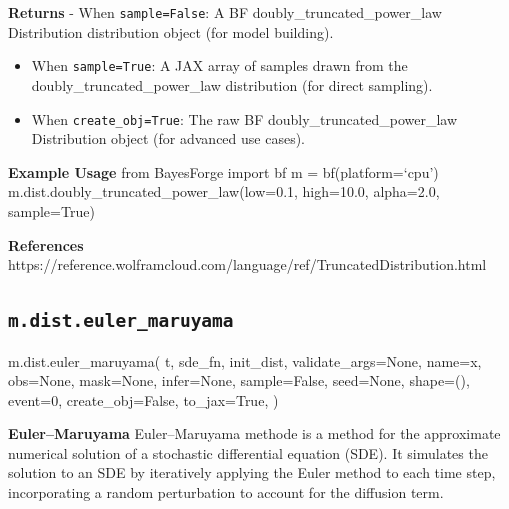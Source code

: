 \documentclass[
  letterpaper,
  DIV=11,
  numbers=noendperiod]{scrartcl}
\newenvironment{Shaded}{\begin{snugshade}}{\end{snugshade}}
\newcommand{\DecValTok}[1]{\textcolor[rgb]{0.68,0.00,0.00}{#1}}
\newcommand{\NormalTok}[1]{\textcolor[rgb]{0.00,0.23,0.31}{#1}}
\newcommand{\OperatorTok}[1]{\textcolor[rgb]{0.37,0.37,0.37}{#1}}
\newcommand{\StringTok}[1]{\textcolor[rgb]{0.13,0.47,0.30}{#1}}
\newcommand{\VariableTok}[1]{\textcolor[rgb]{0.07,0.07,0.07}{#1}}
\begin{document}
\textbf{Returns} - When \texttt{sample=False}: A BF
doubly\_truncated\_power\_law Distribution distribution object (for
model building).

\begin{itemize}
\item
  When \texttt{sample=True}: A JAX array of samples drawn from the
  doubly\_truncated\_power\_law distribution (for direct sampling).
\item
  When \texttt{create\_obj=True}: The raw BF
  doubly\_truncated\_power\_law Distribution object (for advanced use
  cases).
\end{itemize}

\textbf{Example Usage} from BayesForge import bf m =
bf(platform=`cpu')\\
m.dist.doubly\_truncated\_power\_law(low=0.1, high=10.0, alpha=2.0,
sample=True)

\textbf{References}
https://reference.wolframcloud.com/language/ref/TruncatedDistribution.html

\subsection{\texorpdfstring{\texttt{m.dist.euler\_maruyama}}{m.dist.euler\_maruyama}}\label{euler_maruyama}

\begin{Shaded}
\begin{Highlighting}[]
\NormalTok{m.dist.euler\_maruyama(}
\NormalTok{    t,}
\NormalTok{    sde\_fn,}
\NormalTok{    init\_dist,}
\NormalTok{    validate\_args}\OperatorTok{=}\VariableTok{None}\NormalTok{,}
\NormalTok{    name}\OperatorTok{=}\StringTok{\textquotesingle{}x\textquotesingle{}}\NormalTok{,}
\NormalTok{    obs}\OperatorTok{=}\VariableTok{None}\NormalTok{,}
\NormalTok{    mask}\OperatorTok{=}\VariableTok{None}\NormalTok{,}
\NormalTok{    infer}\OperatorTok{=}\VariableTok{None}\NormalTok{,}
\NormalTok{    sample}\OperatorTok{=}\VariableTok{False}\NormalTok{,}
\NormalTok{    seed}\OperatorTok{=}\VariableTok{None}\NormalTok{,}
\NormalTok{    shape}\OperatorTok{=}\NormalTok{(),}
\NormalTok{    event}\OperatorTok{=}\DecValTok{0}\NormalTok{,}
\NormalTok{    create\_obj}\OperatorTok{=}\VariableTok{False}\NormalTok{,}
\NormalTok{    to\_jax}\OperatorTok{=}\VariableTok{True}\NormalTok{,}
\NormalTok{)}
\end{Highlighting}
\end{Shaded}

\textbf{Euler--Maruyama} Euler--Maruyama methode is a method for the
approximate numerical solution of a stochastic differential equation
(SDE). It simulates the solution to an SDE by iteratively applying the
Euler method to each time step, incorporating a random perturbation to
account for the diffusion term.
\end{document}
